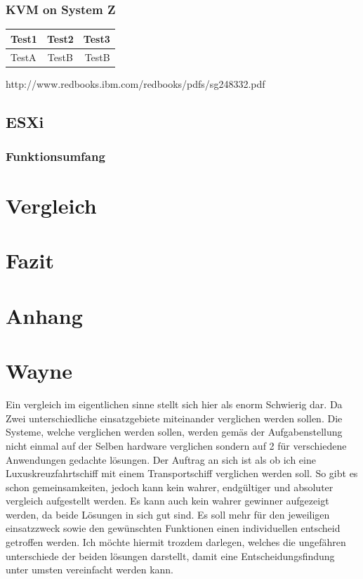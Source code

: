 \documentclass[14pt]{extreport}
\begin{document}
\subsection{KVM on System Z}
\begin{tabular}{ | l | c | r | } \hline
	Test1 & Test2 & Test3 \\ \hline
	TestA & TestB & TestB \\ \hline
\end{tabular}
http://www.redbooks.ibm.com/redbooks/pdfs/sg248332.pdf




\section{ESXi}
\subsection{Funktionsumfang}
\chapter{Vergleich}
\chapter{Fazit}
\chapter{Anhang}




\chapter{Wayne}
Ein vergleich im eigentlichen sinne stellt sich hier als enorm Schwierig dar. Da Zwei unterschiedliche einsatzgebiete miteinander verglichen werden sollen. Die Systeme, welche verglichen werden sollen, werden gemäs der Aufgabenstellung nicht einmal auf der Selben hardware verglichen sondern auf 2 für verschiedene Anwendungen gedachte lösungen. Der Auftrag an sich ist als ob ich eine Luxuskreuzfahrtschiff mit einem Transportschiff verglichen werden soll. So gibt es schon gemeinsamkeiten, jedoch kann kein wahrer, endgültiger und absoluter vergleich aufgestellt werden. Es kann auch kein wahrer gewinner aufgezeigt werden, da beide Lösungen in sich gut sind. Es soll mehr für den jeweiligen einsatzzweck sowie den gewünschten Funktionen einen individuellen entscheid getroffen werden. Ich möchte hiermit trozdem darlegen, welches die ungefähren unterschiede der beiden lösungen darstellt, damit eine Entscheidungsfindung unter umsten vereinfacht werden kann.
\end{document}
